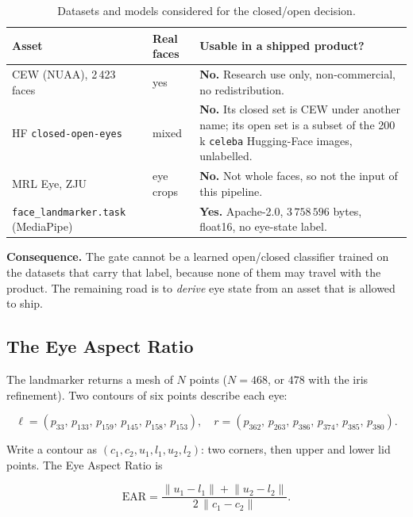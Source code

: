 \documentclass[11pt,a4paper]{article}
\newcommand{\coden}[1]{\texttt{\small #1}}
\begin{document}
\begin{table}[H]
\centering
\caption{Datasets and models considered for the closed/open decision.}
\label{tab:licences}
\renewcommand{\arraystretch}{1.3}
\begin{tabularx}{\linewidth}{@{}l l X@{}}
\toprule
\textbf{Asset} & \textbf{Real faces} & \textbf{Usable in a shipped product?} \\
\midrule
CEW (NUAA), 2\,423 faces & yes & \textbf{No.} Research use only, non-commercial, no redistribution. \\
HF \coden{closed-open-eyes} & mixed & \textbf{No.} Its closed set is CEW under another name; its open set is a subset of the 200\,k \coden{celeba} Hugging-Face images, unlabelled. \\
MRL Eye, ZJU & eye crops & \textbf{No.} Not whole faces, so not the input of this pipeline. \\
\coden{face\_landmarker.task} (MediaPipe) & \textemdash{} & \textbf{Yes.} Apache-2.0, $3\,758\,596$ bytes, float16, no eye-state label. \\
\bottomrule
\end{tabularx}
\end{table}

\begin{keybox}
\textbf{Consequence.} The gate cannot be a learned open/closed
classifier trained on the datasets that carry that label, because
none of them may travel with the product. The remaining road is to
\emph{derive} eye state from an asset that is allowed to ship.
\end{keybox}

\subsection{The Eye Aspect Ratio}

The landmarker returns a mesh of $N$ points ($N=468$, or $478$ with the
iris refinement). Two contours of six points describe each eye:

\begin{equation}
  \ell = \left(p_{33},\,p_{133},\,p_{159},\,p_{145},\,p_{158},\,p_{153}\right),\quad
  r = \left(p_{362},\,p_{263},\,p_{386},\,p_{374},\,p_{385},\,p_{380}\right).
\end{equation}

Write a contour as $(c_1, c_2, u_1, l_1, u_2, l_2)$: two corners, then
upper and lower lid points. The Eye Aspect Ratio is

\begin{equation}
  \mathrm{EAR} = \frac{\lVert u_1-l_1\rVert + \lVert u_2-l_2\rVert}
                       {2\,\lVert c_1-c_2\rVert}.
  \label{eq:ear}
\end{equation}
\end{document}
